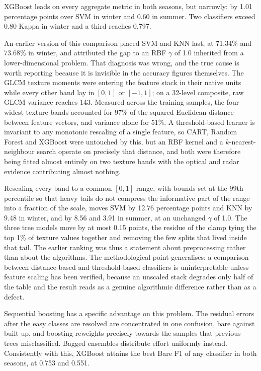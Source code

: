 \documentclass[conference]{IEEEtran}
\begin{document}
XGBoost leads on every aggregate metric in both seasons, but narrowly:
by 1.01 percentage points over SVM in winter and 0.60 in summer. Two
classifiers exceed 0.80 Kappa in winter and a third reaches 0.797.

An earlier version of this comparison placed SVM and KNN last, at
71.34\% and 73.68\% in winter, and attributed the gap to an RBF
$\gamma$ of 1.0 inherited from a lower-dimensional problem. That
diagnosis was wrong, and the true cause is worth reporting because it is
invisible in the accuracy figures themselves. The GLCM texture moments
were entering the feature stack in their native units while every other
band lay in $[0,1]$ or $[-1,1]$; on a 32-level composite, raw GLCM
variance reaches 143. Measured across the training samples, the four
widest texture bands accounted for 97\% of the squared Euclidean
distance between feature vectors, and variance alone for 51\%. A
threshold-based learner is invariant to any monotonic rescaling of a
single feature, so CART, Random Forest and XGBoost were untouched by
this, but an RBF kernel and a $k$-nearest-neighbour search operate on
precisely that distance, and both were therefore being fitted almost
entirely on two texture bands with the optical and radar evidence
contributing almost nothing.

Rescaling every band to a common $[0,1]$ range, with bounds set at the
99th percentile so that heavy tails do not compress the informative part
of the range into a fraction of the scale, moves SVM by 12.76 percentage
points and KNN by 9.48 in winter, and by 8.56 and 3.91 in summer, at an
unchanged $\gamma$ of 1.0. The three tree models move by at most 0.15
points, the residue of the clamp tying the top 1\% of texture values
together and removing the few splits that lived inside that tail. The
earlier ranking was thus a statement about preprocessing rather than
about the algorithms. The methodological point generalises: a comparison
between distance-based and threshold-based classifiers is
uninterpretable unless feature scaling has been verified, because an
unscaled stack degrades only half of the table and the result reads as a
genuine algorithmic difference rather than as a defect.

Sequential boosting has a specific advantage on this problem. The
residual errors after the easy classes are resolved are concentrated in
one confusion, bare against built-up, and boosting reweights precisely
towards the samples that previous trees misclassified. Bagged ensembles
distribute effort uniformly instead. Consistently with this, XGBoost
attains the best Bare F1 of any classifier in both seasons, at 0.753 and
0.551.
\end{document}
